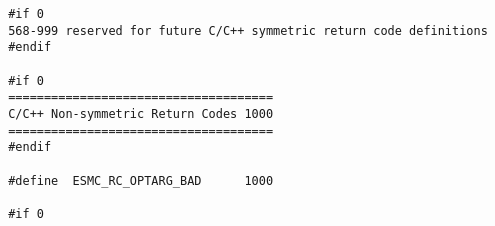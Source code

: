 \begin{verbatim}
 #if 0
 568-999 reserved for future C/C++ symmetric return code definitions
 #endif
 
 #if 0
 =====================================
 C/C++ Non-symmetric Return Codes 1000
 =====================================
 #endif
 
 #define  ESMC_RC_OPTARG_BAD      1000
 
 #if 0
 \end{verbatim}
\setlength{\parskip}{\oldparskip}
\setlength{\parindent}{\oldparindent}
\setlength{\baselineskip}{\oldbaselineskip}
